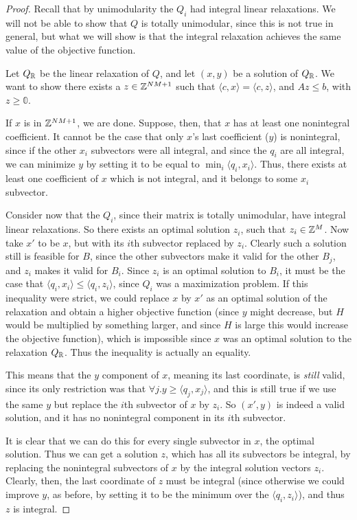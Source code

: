 \begin{proof}
Recall that by unimodularity the $Q_i$ had integral linear relaxations. We will not be able to show that $Q$ is totally unimodular, since this is not true in general, but what we will show is that the integral relaxation achieves the same value of the objective function.

Let $Q_{\mathbb{R}}$ be the linear relaxation of $Q$, and let $(x, y)$ be a solution of $Q_{\mathbb{R}}$. We want to show there exists a $z \in \mathbb{Z}^{NM+1}$ such that $\langle c, x \rangle = \langle c, z \rangle$, and $Az \le b$, with $z \ge \mathbb{0}$.

If $x$ is in $\mathbb{Z}^{NM+1}$, we are done. Suppose, then, that $x$ has at least one nonintegral coefficient. It cannot be the case that only $x$'s last coefficient ($y$) is nonintegral, since if the other $x_i$ subvectors were all integral, and since the $q_i$ are all integral, we can minimize $y$ by setting it to be equal to $\min_i \langle q_i, x_i \rangle$. Thus, there exists at least one coefficient of $x$ which is not integral, and it belongs to some $x_i$ subvector.

Consider now that the $Q_i$, since their matrix is totally unimodular, have integral linear relaxations. So there exists an optimal solution $z_i$, such that $z_i \in \mathbb{Z}^M$. Now take $x'$ to be $x$, but with its $i$th subvector replaced by $z_i$. Clearly such a solution still is feasible for $B$, since the other subvectors make it valid for the other $B_j$, and $z_i$ makes it valid for $B_i$. Since $z_i$ is an optimal solution to $B_i$, it must be the case that $\langle q_i, x_i \rangle \le \langle q_i, z_i \rangle$, since $Q_i$ was a maximization problem. If this inequality were strict, we could replace $x$ by $x'$ as an optimal solution of the relaxation and obtain a higher objective function (since $y$ might decrease, but $H$ would be multiplied by something larger, and since $H$ is large this would increase the objective function), which is impossible since $x$ was an optimal solution to the relaxation $Q_{\mathbb{R}}$. Thus the inequality is actually an equality.

This means that the $y$ component of $x$, meaning its last coordinate, is \emph{still} valid, since its only restriction was that $\forall j. y \ge \langle q_j, x_j \rangle$, and this is still true if we use the same $y$ but replace the $i$th subvector of $x$ by $z_i$. So $(x', y)$ is indeed a valid solution, and it has no nonintegral component in its $i$th subvector.

It is clear that we can do this for every single subvector in $x$, the optimal solution. Thus we can get a solution $z$, which has all its subvectors be integral, by replacing the nonintegral subvectors of $x$ by the integral solution vectors $z_i$. Clearly, then, the last coordinate of $z$ must be integral (since otherwise we could improve $y$, as before, by setting it to be the minimum over the $\langle q_i, z_i \rangle$), and thus $z$ is integral.


\end{proof}
